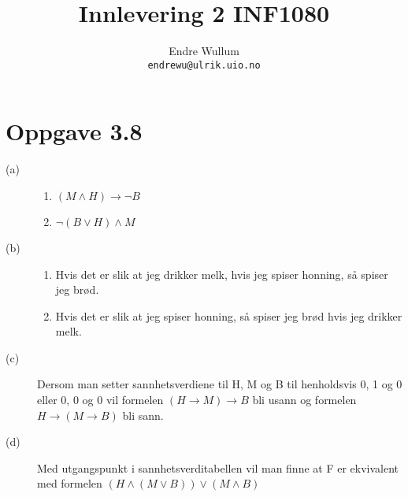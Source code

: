 \documentclass[12pt,norsk,a4paper]{article}
\title{Innlevering 2 INF1080}
\author{Endre Wullum\\ \texttt{endrewu@ulrik.uio.no}}
\begin{document}
\maketitle

\section*{Oppgave 3.8}

\begin{description}
\item[(a)]
\begin{enumerate}
\item $(M \land H) \rightarrow \lnot B$
\item $\lnot(B \lor H) \land M $
\end{enumerate}
\item[(b)]
\begin{enumerate}
\item Hvis det er slik at jeg drikker melk, hvis jeg spiser honning, så spiser jeg brød.
\item Hvis det er slik at jeg spiser honning, så spiser jeg brød hvis jeg drikker melk.
\end{enumerate}
\item[(c)] Dersom man setter sannhetsverdiene til H, M og B til henholdsvis 0, 1 og 0 eller 0, 0 og 0 vil formelen $(H \rightarrow M) \rightarrow B$ bli usann og formelen $H \rightarrow (M \rightarrow B)$ bli sann.
\item[(d)] Med utgangspunkt i sannhetsverditabellen vil man finne at F er ekvivalent med formelen $(H \land (M \lor B)) \lor (M \land B)$

\end{description}


\end{document}
